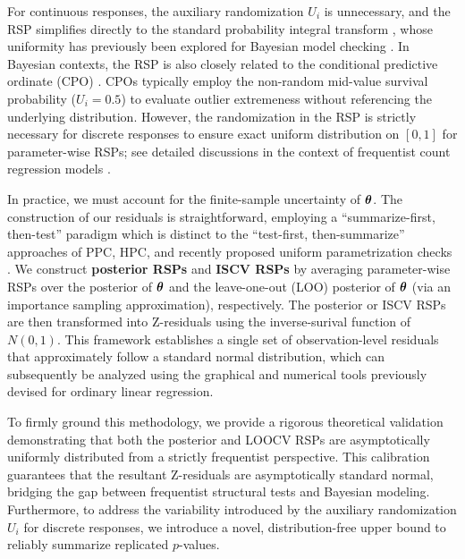 For continuous responses, the auxiliary randomization $U_i$ is unnecessary, and the RSP simplifies directly to the standard probability integral transform \citep{Devroye1986, Angus1994}, whose uniformity has previously been explored for  Bayesian model checking \citep{conn_guide_2018}. In Bayesian contexts, the RSP is also closely related to the conditional predictive ordinate (CPO) \citep{gelfand1992model, seillier1993sequential, seillier1993testing, Gelfand1994, marshall_identifying_2007, li_estimating_2017}. CPOs typically employ the non-random mid-value survival probability ($U_i = 0.5$) to evaluate outlier extremeness without referencing the underlying distribution. However, the randomization in the RSP is strictly necessary for discrete responses to ensure exact uniform distribution on $[0,1]$ for parameter-wise RSPs; see detailed discussions in the context of frequentist count regression models \citep{Fruhwirth-Schnatter1996, Dunn1996, FengCindy2020Acor}.

In practice, we must account for the finite-sample uncertainty of $\bm{\theta}$. The construction of our residuals is straightforward, employing a ``summarize-first, then-test'' paradigm which is distinct to the ``test-first, then-summarize'' approaches of PPC, HPC, and recently proposed uniform parametrization checks \citep{covington2025bayesian}. We construct \textbf{posterior RSPs} and \textbf{ISCV RSPs} by averaging parameter-wise RSPs over the posterior of $\bm{\theta}$ and the leave-one-out (LOO) posterior of $\bm{\theta}$ (via an importance sampling approximation), respectively. The posterior or ISCV RSPs are then transformed into Z-residuals using the inverse-surival function of $N(0,1)$. This framework establishes a single set of observation-level residuals that approximately follow a standard normal distribution, which can subsequently be analyzed using  the graphical and numerical tools previously devised for ordinary linear regression.  

To firmly ground this methodology, we provide a rigorous theoretical validation demonstrating that both the posterior and LOOCV RSPs are asymptotically uniformly distributed from a strictly frequentist perspective. This calibration guarantees that the resultant Z-residuals are asymptotically standard normal, bridging the gap between frequentist structural tests and Bayesian modeling. Furthermore, to address the variability introduced by the auxiliary randomization $U_i$ for discrete responses, we introduce a novel, distribution-free upper bound to reliably summarize replicated $p$-values.

